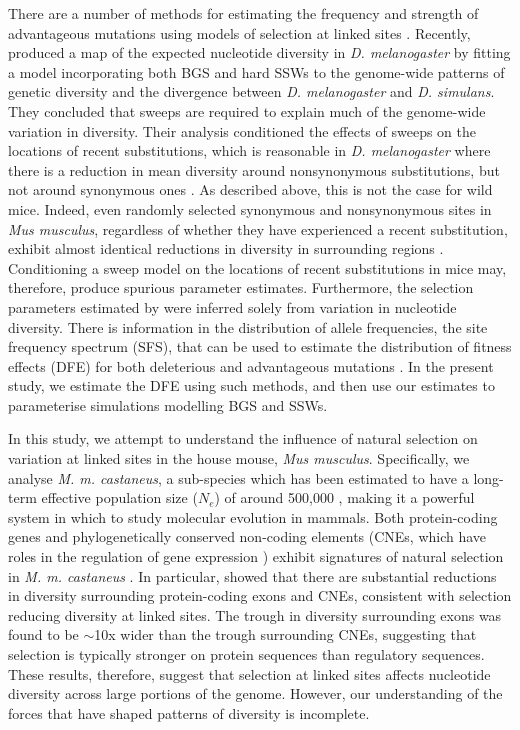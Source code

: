 	There are a number of methods for estimating the frequency and strength of advantageous mutations using models of selection at linked sites \citep{RN352}. Recently, \cite{RN274} produced a map of the expected nucleotide diversity in \textit{D. melanogaster} by fitting a model incorporating both BGS and hard SSWs to the genome-wide patterns of genetic diversity and the divergence between \textit{D. melanogaster} and \textit{D. simulans}. They concluded that sweeps are required to explain much of the genome-wide variation in diversity. Their analysis conditioned the effects of sweeps on the locations of recent substitutions, which is reasonable in \textit{D. melanogaster} where there is a reduction in mean diversity around nonsynonymous substitutions, but not around synonymous ones \citep{RN274}. As described above, this is not the case for wild mice. Indeed, even randomly selected synonymous and nonsynonymous sites in \textit{Mus musculus}, regardless of whether they have experienced a recent substitution, exhibit almost identical reductions in diversity in surrounding regions \cite{RN122}. Conditioning a sweep model on the locations of recent substitutions in mice may, therefore, produce spurious parameter estimates. Furthermore, the selection parameters estimated by \cite{RN122} were inferred solely from variation in nucleotide diversity. There is information in the distribution of allele frequencies, the site frequency spectrum (SFS), that can be used to estimate the distribution of fitness effects (DFE) for both deleterious and advantageous mutations \citep{RN164, RN201, RN210, RN354}. In the present study, we estimate the DFE using such methods, and then use our estimates to parameterise simulations modelling BGS and SSWs.

	In this study, we attempt to understand the influence of natural selection on variation at linked sites in the house mouse, \textit{Mus musculus}. Specifically, we analyse \textit{M. m. castaneus}, a sub-species which has been estimated to have a long-term effective population size ($N_e$) of around 500,000 \citep{RN233, RN158}, making it a powerful system in which to study molecular evolution in mammals. Both protein-coding genes and phylogenetically conserved non-coding elements (CNEs, which have roles in the regulation of gene expression \citep{RN353}) exhibit signatures of natural selection in \textit{M. m. castaneus} \citep{RN122}. In particular, \cite{RN122} showed that there are substantial reductions in diversity surrounding protein-coding exons and CNEs, consistent with selection reducing diversity at linked sites. The trough in diversity surrounding exons was found to be $\sim$10x wider than the trough surrounding CNEs, suggesting that selection is typically stronger on protein sequences than regulatory sequences. These results, therefore, suggest that selection at linked sites affects nucleotide diversity across large portions of the genome. However, our understanding of the forces that have shaped patterns of diversity is incomplete.

